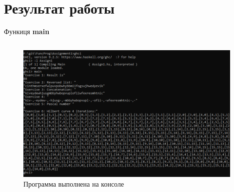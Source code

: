 \documentclass[12pt]{article} %
\begin{document}
\section{Результат работы}
Функиця \textbf{main}
\inputminted[firstline = 90, lastline = 103, frame= single, breaklines]{Haskell}{F:/git/FuncProg/Assignment1/Assign1.hs}

\begin{figure}[H]
\centering \includegraphics[width = \textwidth]{result.png}
\caption{Программа выполнена на консоле}
\end{figure}
\end{document}
